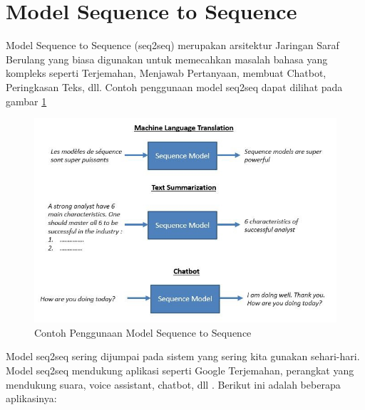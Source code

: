 \section{Model Sequence to Sequence}
Model Sequence to Sequence (seq2seq) merupakan arsitektur Jaringan Saraf Berulang yang biasa digunakan untuk memecahkan masalah bahasa yang kompleks seperti Terjemahan, Menjawab Pertanyaan, membuat Chatbot, Peringkasan Teks, dll. Contoh penggunaan model seq2seq dapat dilihat pada gambar \ref{seqtoseq}
\begin{figure}[H]
        \centerline{\includegraphics[scale=.45]{figures/sequence_model}}
        \caption{Contoh Penggunaan Model Sequence to Sequence}
		\label{seqtoseq}
\end{figure}

Model seq2seq sering dijumpai pada sistem yang sering kita gunakan sehari-hari. Model seq2seq mendukung aplikasi seperti Google Terjemahan, perangkat yang mendukung suara, voice assistant, chatbot, dll . Berikut ini adalah beberapa aplikasinya:

